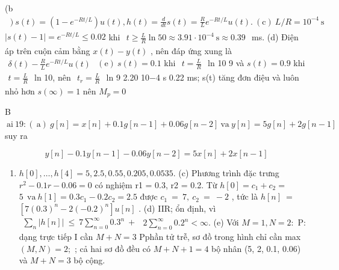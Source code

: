 \documentclass[
  10
]{article}
\providecommand{\tightlist}{%
  \setlength{\itemsep}{0pt}\setlength{\parskip}{0pt}}
\begin{document}
(b
\(\begin{array} { r } { \mathrm { ~ ) ~ } s ( t ) = \left( 1 - e ^ { - R t / L } \right) u ( t ) , h ( t ) = \frac { d } { d t } s ( t ) = \frac { R } { L } e ^ { - R t / L } u ( t ) . \mathrm { ~ ( c ) ~ } L / R = 1 0 ^ { - 4 } \mathrm { ~ s ~ } } \end{array}\)
\(| s ( t ) - 1 | = e ^ { - R t / L } \leq 0 . 0 2\) khi
\(\begin{array} { r } { t \ge \frac { L } { R } \ln 5 0 \approx 3 . 9 1 \cdot 1 0 ^ { - 4 } ~ \mathrm { s } \approx 0 . 3 9 } \end{array}\)
ms. (d) Điện áp trên cuộn cảm bằng \(x ( t ) - y ( t )\) , nên đáp ứng
xung là
\(\begin{array} { r } { \delta ( t ) - \frac { R } { L } e ^ { - R t / L } u ( t ) } \end{array}\)
\(( \mathrm { e } ) \ s ( t ) = 0 . 1\) khi
\(\begin{array} { r } { t = \frac { L } { R } } \end{array}\) ln 10 9 và
\(s ( t ) = 0 . 9\) khi
\(\begin{array} { r } { t = \frac { L } { R } } \end{array}\) ln 10, nên
\(\begin{array} { r } { t _ { r } = \frac { L } { R } } \end{array}\) ln
9 2.20 10−4 s 0.22 ms; s(t) tăng đơn điệu và luôn nhỏ hơn
\(s ( \infty ) = 1\) nên \(M _ { p } = 0\)

B
\({ \mathrm { ~ a i ~ } } 1 9 \colon ( { \mathrm { ~ a } } ) ~ g [ n ] = x [ n ] + 0 . 1 g [ n - 1 ] + 0 . 0 6 g [ n - 2 ] { \mathrm { ~ v a ~ } } y [ n ] = 5 g [ n ] + 2 g [ n - 1 ]\)
suy ra

\[
y [ n ] - 0. 1 y [ n - 1 ] - 0. 0 6 y [ n - 2 ] = 5 x [ n ] + 2 x [ n - 1 ]
\]

\begin{enumerate}
\def\labelenumi{(\alph{enumi})}
\setcounter{enumi}{1}
\tightlist
\item
  \(h [ 0 ] , \ldots , h [ 4 ] = 5 , 2 . 5 , 0 . 5 5 , 0 . 2 0 5 , 0 . 0 5 3 5 .\)
  (c) Phương trình đặc trưng \(r ^ { 2 } - 0 . 1 r - 0 . 0 6 = 0\) có
  nghiệm r1 = 0.3, r2 = 0.2. Từ \(h [ 0 ] = c _ { 1 } + c _ { 2 } =\)
  \(5 \mathrm {  ~ \ v a ~ } h [ 1 ] = 0 . 3 c _ { 1 } - 0 . 2 c _ { 2 } = 2 . 5\)
  được \(c _ { 1 } ~ = ~ 7 , ~ c _ { 2 } ~ = ~ - 2\) , tức là
  \(h [ n ] ~ =\)
  \(\left[ 7 ( 0 . 3 ) ^ { n } - 2 ( - 0 . 2 ) ^ { n } \right] u [ n ]\)
  . (d) IIR; ổn định, vì
  \(\begin{array} { r } { \sum _ { n } | h [ n ] | \ \leq \ 7 \sum _ { n = 0 } ^ { \infty } 0 . 3 ^ { n } \ + } \end{array}\)
  \(\textstyle 2 \sum _ { n = 0 } ^ { \infty } 0 . 2 ^ { n } < \infty .\)
  (e) Với \(M = 1 , N = 2 \colon\) P: dạng trực tiếp I cần \(M + N = 3\)
  Pphần tử trễ, sơ đồ trong hình chỉ cần max \(( M , N ) = 2 ;\) ; cả
  hai sơ đồ đều có \(M + N + 1 = 4\) bộ nhân (5, 2, 0.1, 0.06) và
  \(M + N = 3\) bộ cộng.
\end{enumerate}
\end{document}
